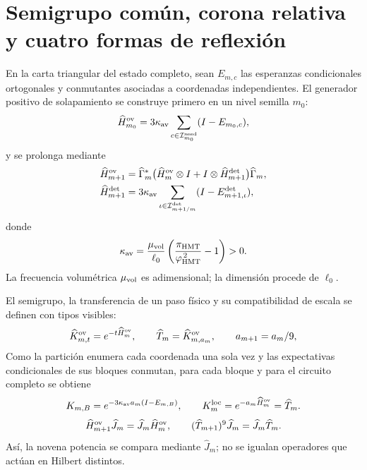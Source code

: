 \section*{Semigrupo común, corona relativa y cuatro formas de reflexión}

En la carta triangular del estado completo, sean \(E_{m,c}\) las esperanzas
condicionales ortogonales y conmutantes asociadas a coordenadas
independientes. El generador positivo de solapamiento se construye primero en
un nivel semilla \(m_0\):
\begin{equation}\label{eq:realizaciones-ym-generador}
 \widehat H_{m_0}^{\rm ov}
 =3\kappa_{\rm av}
  \sum_{c\in\mathcal I_{m_0}^{\rm seed}}(I-E_{m_0,c}),
\end{equation}
y se prolonga mediante
\begin{equation}\label{eq:realizaciones-ym-generador-refinado}
 \begin{aligned}
 \widehat H_{m+1}^{\rm ov}
 &=\widehat\Gamma_m^*
   \bigl(\widehat H_m^{\rm ov}\otimes I+
         I\otimes\widehat H_{m+1}^{\rm det}\bigr)
   \widehat\Gamma_m,\\
 \widehat H_{m+1}^{\rm det}
 &=3\kappa_{\rm av}
   \sum_{\iota\in\mathcal I_{m+1/m}^{\rm det}}
   (I-E_{m+1,\iota}^{\rm det}),
 \end{aligned}
\end{equation}
donde
\begin{equation}\label{eq:realizaciones-ym-kappa}
 \kappa_{\rm av}
 =\frac{\mu_{\rm vol}}{\ell_0}
  \left(\frac{\pi_{\rm HMT}}{\varphi_{\rm HMT}^{\,2}}-1\right)>0.
\end{equation}
La frecuencia volumétrica \(\mu_{\rm vol}\) es adimensional; la dimensión
procede de \(\ell_0\).

El semigrupo, la transferencia de un paso físico y su compatibilidad de
escala se definen con tipos visibles:
\begin{equation}\label{eq:realizaciones-ym-semigrupo}
 \widehat K_{m,t}^{\rm ov}=e^{-t\widehat H_m^{\rm ov}},
 \qquad
 \widehat T_m=\widehat K_{m,a_m}^{\rm ov},
 \qquad a_{m+1}=a_m/9,
\end{equation}
Como la partición enumera cada coordenada una sola vez y las expectativas
condicionales de sus bloques conmutan, para cada bloque y para el circuito
completo se obtiene
\begin{equation}\label{eq:realizaciones-ym-circuito-semigrupo}
 K_{m,B}=e^{-3\kappa_{\rm av}a_m(I-E_{m,B})},
 \qquad
 K_m^{\rm loc}=e^{-a_m\widehat H_m^{\rm ov}}=\widehat T_m.
\end{equation}
\begin{equation}\label{eq:realizaciones-ym-semigrupo-entrelazado}
 \widehat H_{m+1}^{\rm ov}\widehat J_m
 =\widehat J_m\widehat H_m^{\rm ov},
 \qquad
 (\widehat T_{m+1})^9\widehat J_m
 =\widehat J_m\widehat T_m.
\end{equation}
Así, la novena potencia se compara mediante \(\widehat J_m\); no se igualan
operadores que actúan en Hilbert distintos.

